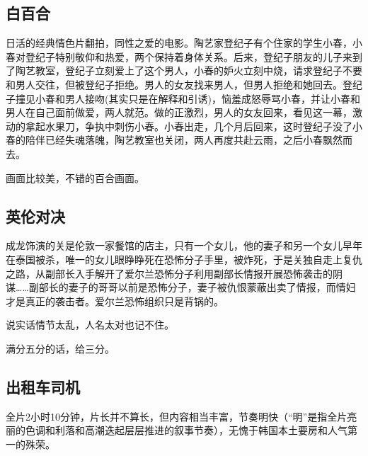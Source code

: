 \subsection{白百合}

日活的经典情色片翻拍，同性之爱的电影。陶艺家登纪子有个住家的学生小春，小春对登纪子特别敬仰和热爱，两个保持着身体关系。后来，登纪子朋友的儿子来到了陶艺教室，登纪子立刻爱上了这个男人，小春的妒火立刻中烧，请求登纪子不要和男人交往，但被登纪子拒绝。男人的女友找来男人，但男人拒绝和她回去。登纪子撞见小春和男人接吻(其实只是在解释和引诱)，恼羞成怒辱骂小春，并让小春和男人在自己面前做爱，两人就范。做的正激烈，男人的女友回来，看见这一幕，激动的拿起水果刀，争执中刺伤小春。小春出走，几个月后回来，这时登纪子没了小春的陪伴已经失魂落魄，陶艺教室也关闭，两人再度共赴云雨，之后小春飘然而去。

画面比较美，不错的百合画面。

\subsection{英伦对决}
成龙饰演的关是伦敦一家餐馆的店主，只有一个女儿，他的妻子和另一个女儿早年在泰国被杀，唯一的女儿眼睁睁死在恐怖分子手里，被炸死，于是关独自走上复仇之路，从副部长入手解开了爱尔兰恐怖分子利用副部长情报开展恐怖袭击的阴谋……副部长的妻子的哥哥以前是恐怖分子，妻子被仇恨蒙蔽出卖了情报，而情妇才是真正的袭击者。爱尔兰恐怖组织只是背锅的。

说实话情节太乱，人名太对也记不住。

满分五分的话，给三分。

\subsection{出租车司机}
全片2小时10分钟，片长并不算长，但内容相当丰富，节奏明快（“明”是指全片亮丽的色调和利落和高潮迭起层层推进的叙事节奏），无愧于韩国本土要房和人气第一的殊荣。

